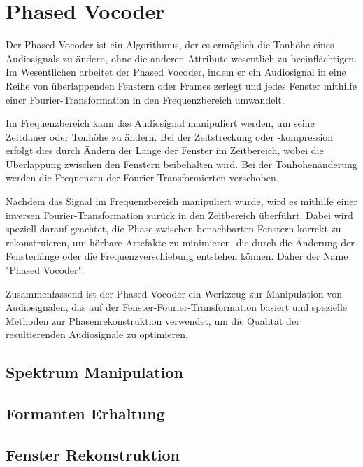 %
%
%
%
\section{Phased Vocoder
\label{autotune:section:phasedVocoder}}
Der Phased Vocoder ist ein Algorithmus,
der es ermöglich die Tonhöhe eines Audiosignals zu ändern, ohne die anderen Attribute wesentlich zu beeinflächtigen.
Im Wesentlichen arbeitet der Phased Vocoder,
indem er ein Audiosignal in eine Reihe von überlappenden Fenstern oder Frames zerlegt und jedes Fenster mithilfe einer Fourier-Transformation in den Frequenzbereich umwandelt.

Im Frequenzbereich kann das Audiosignal manipuliert werden, um seine Zeitdauer oder Tonhöhe zu ändern. Bei der Zeitstreckung oder -kompression erfolgt dies durch Ändern der Länge der Fenster im Zeitbereich,
wobei die Überlappung zwischen den Fenstern beibehalten wird. Bei der Tonhöhenänderung werden die Frequenzen der Fourier-Transformierten verschoben.

Nachdem das Signal im Frequenzbereich manipuliert wurde, wird es mithilfe einer inversen Fourier-Transformation zurück in den Zeitbereich überführt.
Dabei wird speziell darauf geachtet, die Phase zwischen benachbarten Fenstern korrekt zu rekonstruieren, um hörbare Artefakte zu minimieren, die durch die Änderung der Fensterlänge oder die Frequenzverschiebung entstehen können. Daher der Name "Phased Vocoder".

Zusammenfassend ist der Phased Vocoder ein Werkzeug zur Manipulation von Audiosignalen, das auf der Fenster-Fourier-Transformation basiert und spezielle Methoden zur Phasenrekonstruktion verwendet, um die Qualität der resultierenden Audiosignale zu optimieren.


\subsection{Spektrum Manipulation
\label{autotune:subsection:spektrumManipulation}}



\subsection{Formanten Erhaltung
\label{autotune:subsection:formantenErhaltung}}



\subsection{Fenster Rekonstruktion
\label{autotune:subsection:fensterRekonstruktion}}
